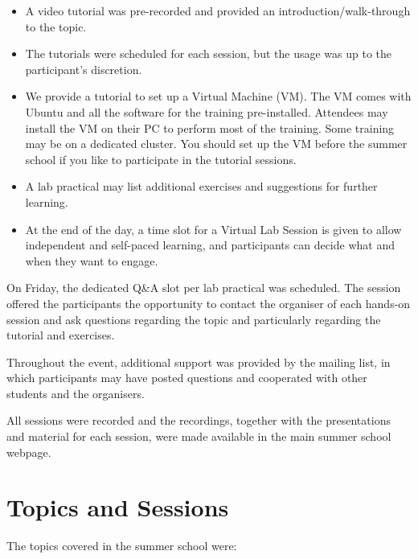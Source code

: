 \begin{itemize}

\item A video tutorial was pre-recorded and provided an introduction/walk-through to the topic.

\item The tutorials were scheduled for each session, but the usage was up to the participant's discretion.

\item We provide a tutorial to set up a Virtual Machine (VM). The VM comes with Ubuntu and all the software for the training pre-installed. Attendees may install the VM on their PC to perform most of the training. Some training may be on a dedicated cluster. You should set up the VM before the summer school if you like to participate in the tutorial sessions.

\item A lab practical may list additional exercises and suggestions for further learning.

\item At the end of the day, a time slot for a Virtual Lab Session is given to allow independent and self-paced learning, and participants can decide what and when they want to engage.

\end{itemize}

On Friday, the dedicated Q\&A slot per lab practical was scheduled. The session offered the participants the opportunity to contact the organiser of each hands-on session and ask questions regarding the topic and particularly regarding the tutorial and exercises.

Throughout the event, additional support was provided by the mailing list, in which participants may have posted questions and cooperated with other students and the organisers.

All sessions were recorded and the recordings, together with the presentations and material for each session, were made available in the main summer school webpage.

\section{Topics and Sessions}

The topics covered in the summer school were:

